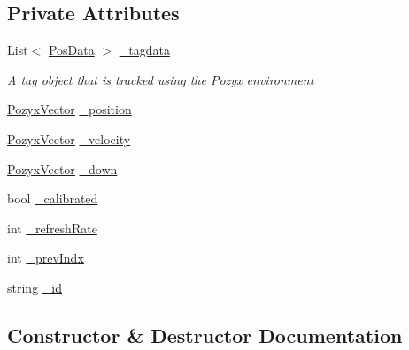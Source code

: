 \subsection*{Private Attributes}
\begin{DoxyCompactItemize}
\item 
List$<$ \hyperlink{struct_pozyx_positioner_1_1_framework_1_1_pos_data}{Pos\+Data} $>$ \hyperlink{class_pozyx_positioner_1_1_framework_1_1_tag_aca228bcaae42b55b93745415a33e2a61}{\+\_\+tagdata}
\begin{DoxyCompactList}\small\item\em A tag object that is tracked using the Pozyx environment \end{DoxyCompactList}\item 
\hyperlink{struct_pozyx_positioner_1_1_framework_1_1_pozyx_vector}{Pozyx\+Vector} \hyperlink{class_pozyx_positioner_1_1_framework_1_1_tag_a02977bc7f7149d3f42049e26341c7e65}{\+\_\+position}
\item 
\hyperlink{struct_pozyx_positioner_1_1_framework_1_1_pozyx_vector}{Pozyx\+Vector} \hyperlink{class_pozyx_positioner_1_1_framework_1_1_tag_a7847c9687168bc94d936bb9bf2d44bad}{\+\_\+velocity}
\item 
\hyperlink{struct_pozyx_positioner_1_1_framework_1_1_pozyx_vector}{Pozyx\+Vector} \hyperlink{class_pozyx_positioner_1_1_framework_1_1_tag_a542f3cf1a7aa888a5f803cf90967e117}{\+\_\+down}
\item 
bool \hyperlink{class_pozyx_positioner_1_1_framework_1_1_tag_a8d2034cbbee073290ce6b4a4ab504c85}{\+\_\+calibrated}
\item 
int \hyperlink{class_pozyx_positioner_1_1_framework_1_1_tag_aa87e59705ade22a9cc2d16c2d7e9fb27}{\+\_\+refresh\+Rate}
\item 
int \hyperlink{class_pozyx_positioner_1_1_framework_1_1_tag_ab1e1c3f330628259251be363086d9cea}{\+\_\+prev\+Indx}
\item 
string \hyperlink{class_pozyx_positioner_1_1_framework_1_1_tag_ac346aed5fb8ebb7a8830848f7ed57899}{\+\_\+id}
\end{DoxyCompactItemize}


\subsection{Constructor \& Destructor Documentation}
\mbox{\label{class_pozyx_positioner_1_1_framework_1_1_tag_a6d2e7bd4c11d5f5f32cc57c38b343542}} 
